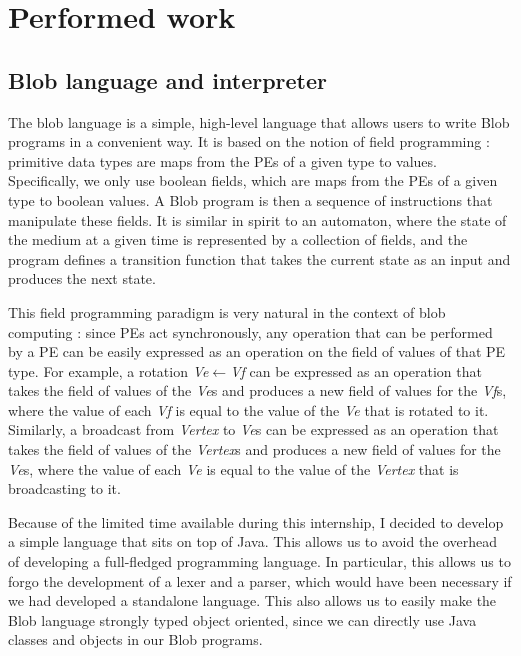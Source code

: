 \documentclass[11pt,a4paper]{report}
\begin{document}
\chapter{Performed work}
\label{cap:work}

\lipsum[1]

\section{Blob language and interpreter}

The blob language is a simple, high-level language that allows users to write Blob programs in a convenient way. It is based on the notion of field programming : primitive data types are maps from the PEs of a given type to values. Specifically, we only use boolean fields, which are maps from the PEs of a given type to boolean values. A Blob program is then a sequence of instructions that manipulate these fields. It is similar in spirit to an automaton, where the state of the medium at a given time is represented by a collection of fields, and the program defines a transition function that takes the current state as an input and produces the next state.

This field programming paradigm is very natural in the context of blob computing : since PEs act synchronously, any operation that can be performed by a PE can be easily expressed as an operation on the field of values of that PE type. For example, a rotation \textit{Ve}$\leftarrow$\textit{Vf} can be expressed as an operation that takes the field of values of the \textit{Ve}s and produces a new field of values for the \textit{Vf}s, where the value of each \textit{Vf} is equal to the value of the \textit{Ve} that is rotated to it. Similarly, a broadcast from \textit{Vertex} to \textit{Ve}s can be expressed as an operation that takes the field of values of the \textit{Vertex}s and produces a new field of values for the \textit{Ve}s, where the value of each \textit{Ve} is equal to the value of the \textit{Vertex} that is broadcasting to it.

Because of the limited time available during this internship, I decided to develop a simple language that sits on top of Java. This allows us to avoid the overhead of developing a full-fledged programming language. In particular, this allows us to forgo the development of a lexer and a parser, which would have been necessary if we had developed a standalone language. This also allows us to easily make the Blob language strongly typed object oriented, since we can directly use Java classes and objects in our Blob programs.
\end{document}
